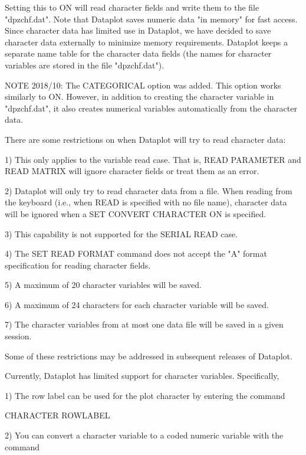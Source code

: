 Setting this to ON will read character fields and write them to the
file "dpzchf.dat".  Note that Dataplot saves numeric data
"in memory" for fast access.  Since character data has limited
use in Dataplot, we have decided to save character data 
externally to minimize memory requirements.  Dataplot keeps a
separate name table for the character data fields (the names for
character variables are stored in the file "dpzchf.dat").

NOTE 2018/10: The CATEGORICAL option was added.  This option works
              similarly to ON.  However, in addition to creating the
              character variable in "dpzchf.dat", it also creates
              numerical variables automatically from the character
              data.

There are some restrictions on when Dataplot will try to
read character data:

   1) This only applies to the variable read case.  That
      is, READ PARAMETER and READ MATRIX will ignore
      character fields or treat them as an error.

   2) Dataplot will only try to read character data from
      a file.  When reading from the keyboard (i.e., when
      READ is specified with no file name), character data
      will be ignored when a SET CONVERT CHARACTER ON is
      specified.

   3) This capability is not supported for the SERIAL READ
      case.

   4) The SET READ FORMAT command does not accept the
      "A" format specification for reading character
      fields.

   5) A maximum of 20 character variables will be saved.

   6) A maximum of 24 characters for each character variable
      will be saved.

   7) The character variables from at most one data file
      will be saved in a given session.

Some of these restrictions may be addressed in subsequent
releases of Dataplot.

Currently, Dataplot has limited support for character variables.
Specifically,

   1) The row label can be used for the plot character by
      entering the command

        CHARACTER ROWLABEL

   2) You can convert a character variable to a coded numeric
      variable with the command

